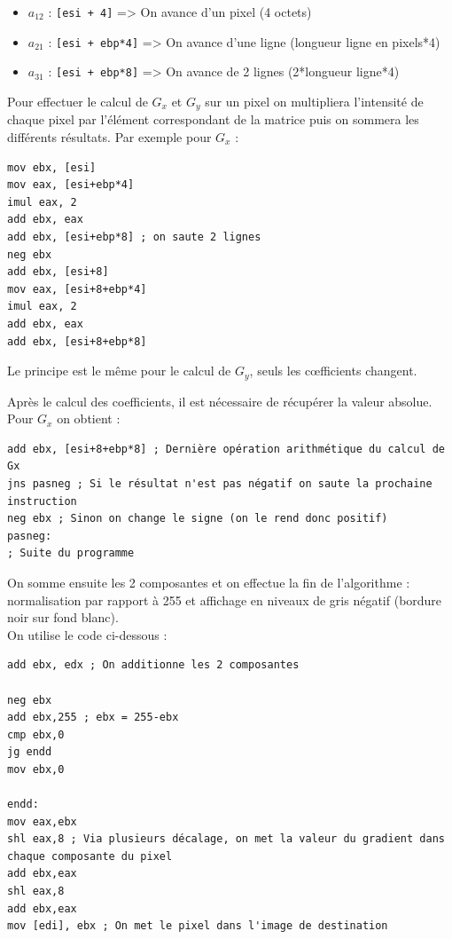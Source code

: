 \begin{itemize}
    \item $a_{12}$ : \lstinline{[esi + 4]} => On avance d'un pixel (4 octets) 
    \item $a_{21}$ : \lstinline{[esi + ebp*4]} => On avance d'une ligne (longueur ligne en pixels*4)
    \item $a_{31}$ : \lstinline{[esi + ebp*8]} => On avance de 2 lignes (2*longueur ligne*4) 
\end{itemize}

\bigskip

Pour effectuer le calcul de $G_x$ et $G_y$ sur un pixel on multipliera l'intensité de chaque pixel par l'élément correspondant de la matrice puis on sommera les différents résultats.
Par exemple pour $G_x$ :
\assembly
\begin{lstlisting}
mov ebx, [esi]
mov eax, [esi+ebp*4]
imul eax, 2
add ebx, eax
add ebx, [esi+ebp*8] ; on saute 2 lignes
neg ebx
add ebx, [esi+8]
mov eax, [esi+8+ebp*4]
imul eax, 2
add ebx, eax
add ebx, [esi+8+ebp*8]
\end{lstlisting}
Le principe est le même pour le calcul de $G_y$, seuls les c\oe{}fficients changent.

\bigskip

Après le calcul des coefficients, il est nécessaire de récupérer la valeur absolue. Pour $G_x$ on obtient :
\begin{lstlisting}
add ebx, [esi+8+ebp*8] ; Dernière opération arithmétique du calcul de Gx
jns pasneg ; Si le résultat n'est pas négatif on saute la prochaine instruction
neg ebx ; Sinon on change le signe (on le rend donc positif)
pasneg:
; Suite du programme
\end{lstlisting}

\bigskip

On somme ensuite les 2 composantes et on effectue la fin de l'algorithme : normalisation par rapport à 255 et affichage en niveaux de gris \og négatif\fg{} (bordure noir sur fond blanc).\\
On utilise le code ci-dessous :
\begin{lstlisting}
add ebx, edx ; On additionne les 2 composantes

neg ebx
add ebx,255 ; ebx = 255-ebx
cmp ebx,0
jg endd
mov ebx,0

endd:
mov eax,ebx
shl eax,8 ; Via plusieurs décalage, on met la valeur du gradient dans chaque composante du pixel
add ebx,eax
shl eax,8
add ebx,eax
mov [edi], ebx ; On met le pixel dans l'image de destination
\end{lstlisting}

